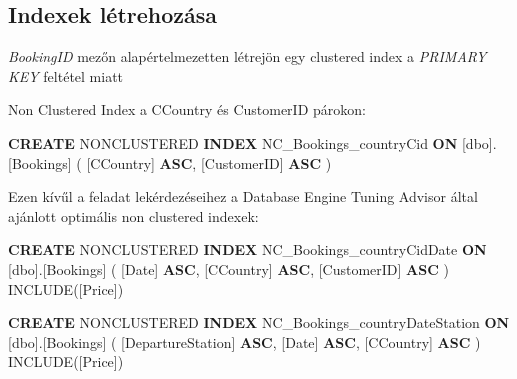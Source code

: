 \documentclass[
]{article}
\newenvironment{Shaded}{\begin{snugshade}}{\end{snugshade}}
\newcommand{\DataTypeTok}[1]{\textcolor[rgb]{0.56,0.13,0.00}{#1}}
\newcommand{\DecValTok}[1]{\textcolor[rgb]{0.25,0.63,0.44}{#1}}
\newcommand{\FunctionTok}[1]{\textcolor[rgb]{0.02,0.16,0.49}{#1}}
\newcommand{\KeywordTok}[1]{\textcolor[rgb]{0.00,0.44,0.13}{\textbf{#1}}}
\newcommand{\NormalTok}[1]{#1}
\newcommand{\OperatorTok}[1]{\textcolor[rgb]{0.40,0.40,0.40}{#1}}
\begin{document}
\begin{Shaded}
\end{Shaded}

\hypertarget{indexek-luxe9trehozuxe1sa}{%
\subsection{Indexek létrehozása}\label{indexek-luxe9trehozuxe1sa}}

\emph{BookingID} mezőn alapértelmezetten létrejön egy clustered index a
\emph{PRIMARY KEY} feltétel miatt

Non Clustered Index a CCountry és CustomerID párokon:

\begin{Shaded}
\begin{Highlighting}[]
\KeywordTok{CREATE}\NormalTok{ NONCLUSTERED }\KeywordTok{INDEX}\NormalTok{ NC_Bookings_countryCid }\KeywordTok{ON}\NormalTok{ [dbo].[Bookings]}
\NormalTok{(}
\NormalTok{    [CCountry] }\KeywordTok{ASC}\NormalTok{,}
\NormalTok{    [CustomerID] }\KeywordTok{ASC}
\NormalTok{)}
\end{Highlighting}
\end{Shaded}

Ezen kívűl a feladat lekérdezéseihez a Database Engine Tuning Advisor
által ajánlott optimális non clustered indexek:

\begin{Shaded}
\begin{Highlighting}[]
\KeywordTok{CREATE}\NormalTok{ NONCLUSTERED }\KeywordTok{INDEX}\NormalTok{ NC_Bookings_countryCidDate }\KeywordTok{ON}\NormalTok{ [dbo].[Bookings]}
\NormalTok{(}
\NormalTok{    [}\DataTypeTok{Date}\NormalTok{] }\KeywordTok{ASC}\NormalTok{,}
\NormalTok{    [CCountry] }\KeywordTok{ASC}\NormalTok{,}
\NormalTok{    [CustomerID] }\KeywordTok{ASC}
\NormalTok{)}
\NormalTok{INCLUDE([Price])}

\KeywordTok{CREATE}\NormalTok{ NONCLUSTERED }\KeywordTok{INDEX}\NormalTok{ NC_Bookings_countryDateStation }\KeywordTok{ON}\NormalTok{ [dbo].[Bookings]}
\NormalTok{(}
\NormalTok{    [DepartureStation] }\KeywordTok{ASC}\NormalTok{,}
\NormalTok{    [}\DataTypeTok{Date}\NormalTok{] }\KeywordTok{ASC}\NormalTok{,}
\NormalTok{    [CCountry] }\KeywordTok{ASC}
\NormalTok{)}
\NormalTok{INCLUDE([Price])}
\end{Highlighting}
\end{Shaded}
\end{document}
